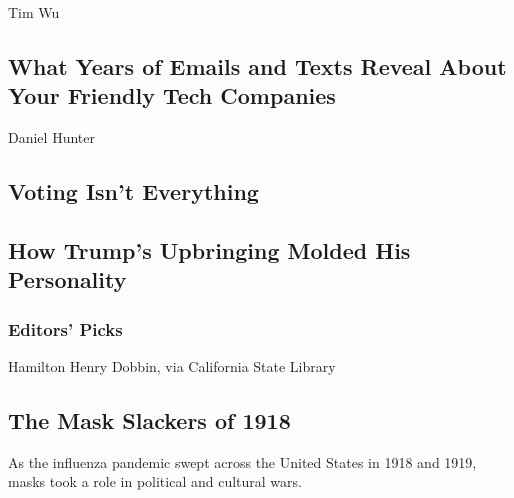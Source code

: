 Tim Wu

\hypertarget{what-years-of-emails-and-texts-reveal-about-your-friendly-tech-companies}{%
\subsection{What Years of Emails and Texts Reveal About Your Friendly
Tech
Companies}\label{what-years-of-emails-and-texts-reveal-about-your-friendly-tech-companies}}

\href{/2020/08/04/opinion/voting-2020-election-blm-movement.html}{}

Daniel Hunter

\hypertarget{voting-isnt-everything}{%
\subsection{Voting Isn't Everything}\label{voting-isnt-everything}}

\href{/2020/08/04/opinion/letters/trump-family.html}{}

\hypertarget{how-trumps-upbringing-molded-his-personality}{%
\subsection{How Trump's Upbringing Molded His
Personality}\label{how-trumps-upbringing-molded-his-personality}}

\hypertarget{editors-picks}{%
\subsubsection{Editors' Picks}\label{editors-picks}}

\href{/2020/08/03/us/mask-protests-1918.html}{}

Hamilton Henry Dobbin, via California State Library

\href{/2020/08/03/us/mask-protests-1918.html}{}

\hypertarget{the-mask-slackers-of-1918}{%
\subsection{The Mask Slackers of 1918}\label{the-mask-slackers-of-1918}}

As the influenza pandemic swept across the United States in 1918 and
1919, masks took a role in political and cultural wars.

\href{/2020/08/04/books/review/a-furious-sky-hurricanes-eric-jay-dolan.html}{}

